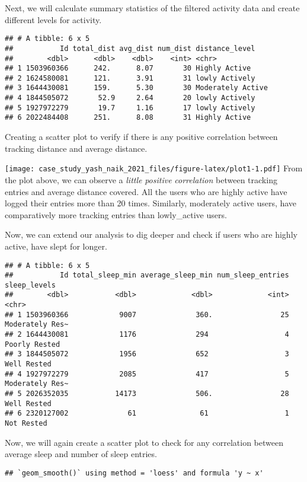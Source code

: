 \documentclass[
]{article}
\begin{document}
Next, we will calculate summary statistics of the filtered activity data
and create different levels for activity.

\begin{verbatim}
## # A tibble: 6 x 5
##           Id total_dist avg_dist num_dist distance_level   
##        <dbl>      <dbl>    <dbl>    <int> <chr>            
## 1 1503960366      242.      8.07       30 Highly Active    
## 2 1624580081      121.      3.91       31 lowly Actively   
## 3 1644430081      159.      5.30       30 Moderately Active
## 4 1844505072       52.9     2.64       20 lowly Actively   
## 5 1927972279       19.7     1.16       17 lowly Actively   
## 6 2022484408      251.      8.08       31 Highly Active
\end{verbatim}

Creating a scatter plot to verify if there is any positive correlation
between tracking distance and average distance.

\texttt{[image: case\_study\_yash\_naik\_2021\_files/figure-latex/plot1-1.pdf]}
From the plot above, we can observe a \emph{little} \emph{positive}
\emph{correlation} between tracking entries and average distance
covered. All the users who are highly active have logged their entries
more than 20 times. Similarly, moderately active users, have
comparatively more tracking entries than lowly\_active users.

Now, we can extend our analysis to dig deeper and check if users who are
highly active, have slept for longer.

\begin{verbatim}
## # A tibble: 6 x 5
##           Id total_sleep_min average_sleep_min num_sleep_entries sleep_levels   
##        <dbl>           <dbl>             <dbl>             <int> <chr>          
## 1 1503960366            9007              360.                25 Moderately Res~
## 2 1644430081            1176              294                  4 Poorly Rested  
## 3 1844505072            1956              652                  3 Well Rested    
## 4 1927972279            2085              417                  5 Moderately Res~
## 5 2026352035           14173              506.                28 Well Rested    
## 6 2320127002              61               61                  1 Not Rested
\end{verbatim}

Now, we will again create a scatter plot to check for any correlation
between average sleep and number of sleep entries.

\begin{verbatim}
## `geom_smooth()` using method = 'loess' and formula 'y ~ x'
\end{verbatim}
\end{document}
